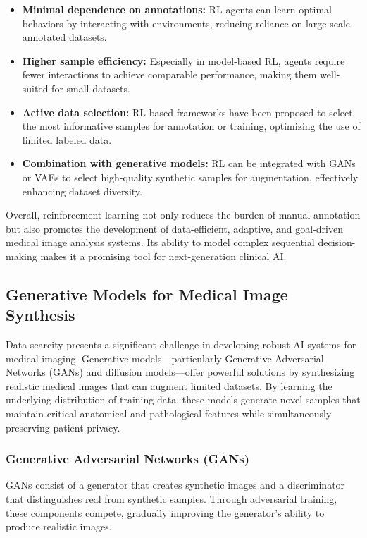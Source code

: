 \documentclass{article}
\begin{document}
\begin{itemize}
    \item \textbf{Minimal dependence on annotations:} RL agents can learn optimal behaviors by interacting with environments, reducing reliance on large-scale annotated datasets.
    \item \textbf{Higher sample efficiency:} Especially in model-based RL, agents require fewer interactions to achieve comparable performance, making them well-suited for small datasets.
    \item \textbf{Active data selection:} RL-based frameworks have been proposed to select the most informative samples for annotation or training, optimizing the use of limited labeled data.
    \item \textbf{Combination with generative models:} RL can be integrated with GANs or VAEs to select high-quality synthetic samples for augmentation, effectively enhancing dataset diversity.
\end{itemize}

Overall, reinforcement learning not only reduces the burden of manual annotation but also promotes the development of data-efficient, adaptive, and goal-driven medical image analysis systems. Its ability to model complex sequential decision-making makes it a promising tool for next-generation clinical AI.



\subsection{Generative Models for Medical Image Synthesis}
Data scarcity presents a significant challenge in developing robust AI systems for medical imaging. Generative models—particularly Generative Adversarial Networks (GANs)\cite{Goodfellow2014GenerativeAN} and diffusion models\cite{SohlDickstein2015DeepUL}—offer powerful solutions by synthesizing realistic medical images that can augment limited datasets\cite{koetzierGeneratingSyntheticData2024}. By learning the underlying distribution of training data, these models generate novel samples that maintain critical anatomical and pathological features while simultaneously preserving patient privacy.

\subsubsection{Generative Adversarial Networks (GANs)}
GANs consist of a generator that creates synthetic images and a discriminator that distinguishes real from synthetic samples. Through adversarial training, these components compete, gradually improving the generator's ability to produce realistic images\cite{Goodfellow2014GenerativeAN}.
\end{document}
